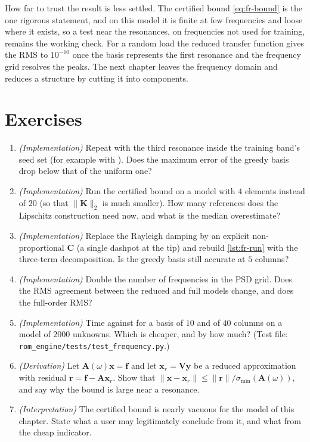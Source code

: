 How far to trust the result is less settled. The certified bound \eqref{eq:fr-bound} is the one rigorous statement, and on this model it is finite at few frequencies and loose where it exists, so a test near the resonances, on frequencies not used for training, remains the working check. For a random load the reduced transfer function gives the RMS to $10^{-10}$ once the basis represents the first resonance and the frequency grid resolves the peaks. The next chapter leaves the frequency domain and reduces a structure by cutting it into components.

\section*{Exercises}\label{sec:fr-exercises}
\begin{enumerate}
\item \emph{(Implementation)} Repeat  with the third resonance inside the training band's seed set (for example with ). Does the maximum error of the greedy basis drop below that of the uniform one?
\item \emph{(Implementation)} Run the certified bound on a model with $4$ elements instead of $20$ (so that $\|\bm K\|_2$ is much smaller). How many references does the Lipschitz construction need now, and what is the median overestimate?
\item \emph{(Implementation)} Replace the Rayleigh damping by an explicit non-proportional $\bm C$ (a single dashpot at the tip) and rebuild \cref{lst:fr-run} with the three-term decomposition. Is the greedy basis still accurate at $5$ columns?
\item \emph{(Implementation)} Double the number of frequencies in the PSD grid. Does the RMS agreement between the reduced and full models change, and does the full-order RMS?
\item \emph{(Implementation)} Time  against  for a basis of $10$ and of $40$ columns on a model of $2000$ unknowns. Which is cheaper, and by how much? (Test file: \texttt{rom\_engine/tests/test\_frequency.py}.)
\item \emph{(Derivation)} Let $\bm A(\omega)\bm x=\bm f$ and let $\bm x_r=\bm V\bm y$ be a reduced approximation with residual $\bm r=\bm f-\bm A\bm x_r$. Show that $\|\bm x-\bm x_r\|\le\|\bm r\|/\sigma_{\min}(\bm A(\omega))$, and say why the bound is large near a resonance.
\item \emph{(Interpretation)} The certified bound is nearly vacuous for the model of this chapter. State what a user may legitimately conclude from it, and what from the cheap indicator.
\end{enumerate}

\chapterrefs

